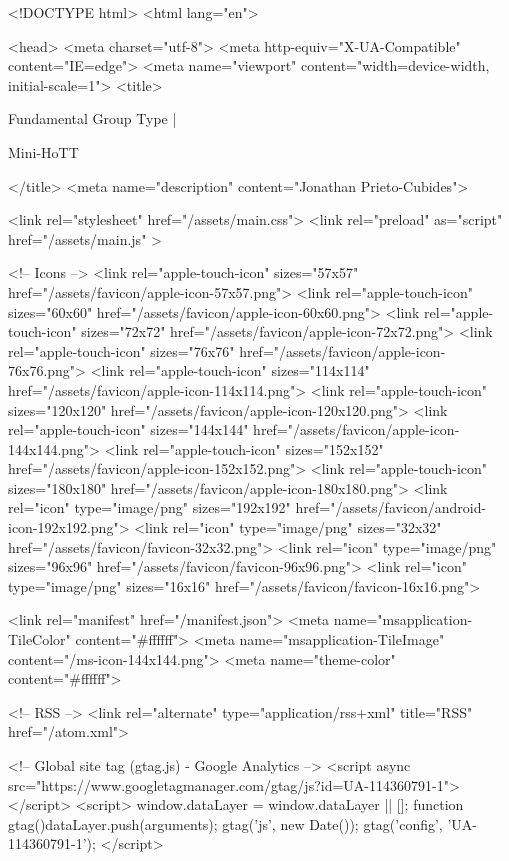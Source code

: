 <!DOCTYPE html>
<html lang="en">

<head>
  <meta charset="utf-8">
  <meta http-equiv="X-UA-Compatible" content="IE=edge">
  <meta name="viewport" content="width=device-width, initial-scale=1">
  <title>
    
      
        Fundamental Group Type |
      
        Mini-HoTT
    
  </title>
  <meta name="description" content="Jonathan Prieto-Cubides">

  <link rel="stylesheet" href="/assets/main.css">
  <link rel="preload" as="script" href="/assets/main.js" >

  <!-- Icons -->
  <link rel="apple-touch-icon" sizes="57x57" href="/assets/favicon/apple-icon-57x57.png">
  <link rel="apple-touch-icon" sizes="60x60" href="/assets/favicon/apple-icon-60x60.png">
  <link rel="apple-touch-icon" sizes="72x72" href="/assets/favicon/apple-icon-72x72.png">
  <link rel="apple-touch-icon" sizes="76x76" href="/assets/favicon/apple-icon-76x76.png">
  <link rel="apple-touch-icon" sizes="114x114" href="/assets/favicon/apple-icon-114x114.png">
  <link rel="apple-touch-icon" sizes="120x120" href="/assets/favicon/apple-icon-120x120.png">
  <link rel="apple-touch-icon" sizes="144x144" href="/assets/favicon/apple-icon-144x144.png">
  <link rel="apple-touch-icon" sizes="152x152" href="/assets/favicon/apple-icon-152x152.png">
  <link rel="apple-touch-icon" sizes="180x180" href="/assets/favicon/apple-icon-180x180.png">
  <link rel="icon" type="image/png" sizes="192x192"  href="/assets/favicon/android-icon-192x192.png">
  <link rel="icon" type="image/png" sizes="32x32" href="/assets/favicon/favicon-32x32.png">
  <link rel="icon" type="image/png" sizes="96x96" href="/assets/favicon/favicon-96x96.png">
  <link rel="icon" type="image/png" sizes="16x16" href="/assets/favicon/favicon-16x16.png">

  <link rel="manifest" href="/manifest.json">
  <meta name="msapplication-TileColor" content="#ffffff">
  <meta name="msapplication-TileImage" content="/ms-icon-144x144.png">
  <meta name="theme-color" content="#ffffff">

  <!-- RSS -->
  <link rel="alternate" type="application/rss+xml" title="RSS" href="/atom.xml">

  <!-- Global site tag (gtag.js) - Google Analytics -->
  <script async src="https://www.googletagmanager.com/gtag/js?id=UA-114360791-1"></script>
  <script>
    window.dataLayer = window.dataLayer || [];
    function gtag(){dataLayer.push(arguments);}
    gtag('js', new Date());
    gtag('config', 'UA-114360791-1');
  </script>

